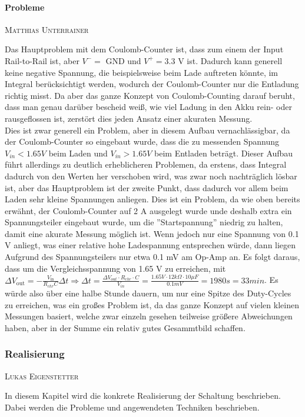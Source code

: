 \documentclass[12pt,a4paper,bibliography=totocnumbered,listof=totocnumbered]{article}
\makeatletter
\newcommand{\chapterauthor}[1]{%
  {\parindent0pt\vspace*{-5pt}%
  \linespread{1.1}\small\scshape#1%
  \par\nobreak\vspace*{3pt}}
  \@afterheading%
}
\makeatother
\begin{document}
\paragraph{Probleme}
\chapterauthor{Matthias Unterrainer}
Das Hauptproblem mit dem Coulomb-Counter ist, dass zum einem der Input Rail-to-Rail ist, aber $V^- =$ GND und $V^+ = 3.3$ V ist. Dadurch kann generell keine negative Spannung, die beispielsweise beim Lade auftreten könnte, im Integral berücksichtigt werden, wodurch der Coulomb-Counter nur die Entladung richtig misst. Da aber das ganze Konzept von Coulomb-Counting darauf beruht, dass man genau darüber bescheid weiß, wie viel Ladung in den Akku rein- oder rausgeflossen ist, zerstört dies jeden Ansatz einer akuraten Messung.\\
Dies ist zwar generell ein Problem, aber in diesem Aufbau vernachlässigbar, da der Coulomb-Counter so eingebaut wurde, dass die zu messenden Spannung $V_{in} < 1.65 V$ beim Laden und $V_{in} > 1.65 V$ beim Entladen beträgt. Dieser Aufbau führt allerdings zu deutlich erheblicheren Problemen, da erstens, dass Integral dadurch von den Werten her verschoben wird, was zwar noch nachträglich lösbar ist, aber das Hauptproblem ist der zweite Punkt, dass dadurch vor allem beim Laden sehr kleine Spannungen anliegen. Dies ist ein Problem, da wie oben bereits erwähnt, der Coulomb-Counter auf 2 A ausgelegt wurde unde deshalb extra ein Spannungsteiler eingebaut wurde, um die ''Startspannung'' niedrig zu halten, damit eine akurate Messung möglich ist. Wenn jedoch nur eine Spannung von 0.1 V anliegt, was einer relative hohe Ladespannung entsprechen würde, dann liegen Aufgrund des Spannungsteilers nur etwa 0.1 mV am Op-Amp an. Es folgt daraus, dass um die Vergleichsspannung von 1.65 V zu erreichen, mit $\Delta V_{\text{out}} = - \frac{V_{\text{in}}}{R_{chr}C} \Delta t \Rightarrow \Delta t = \frac{\Delta V_{out} \cdot R_{chr} \cdot C}{V_{in}} = \frac{1.65 V \cdot 12 k\Omega \cdot 10 \mu F}{0.1 mV} = 1980 s = 33 min$. Es würde also über eine halbe Stunde dauern, um nur eine Spitze des Duty-Cycles zu erreichen, was ein großes Problem ist, da das ganze Konzept auf vielen kleinen Messungen basiert, welche zwar einzeln gesehen teilweise größere Abweichungen haben, aber in der Summe ein relativ gutes Gesammtbild schaffen.

\subsubsection{Realisierung}
\chapterauthor{Lukas Eigenstetter}
In diesem Kapitel wird die konkrete Realisierung der Schaltung beschrieben.
Dabei werden die Probleme und angewendeten Techniken beschrieben.\\
\end{document}
